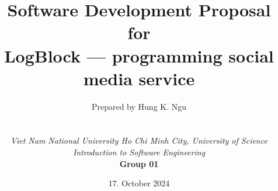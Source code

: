 
\def\Institute{\textit{Viet Nam National University Ho Chi Minh City, University of Science}}
\def\Course{\textit{Introduction to Software Engineering}}
\def\GroupID{\textbf{Group 01}}

\def\BoldTitle{Software Development Proposal}

\def\Subtitle{for \\ LogBlock --- programming social media service \\}
\def\Authors{Prepared by Hung K. Ngu } 


\title{\textbf{\BoldTitle}\\\Subtitle}
\author{\Authors\\ \\ \\ \Institute\\ \Course\\ \GroupID\\}
\date{17. October 2024}

